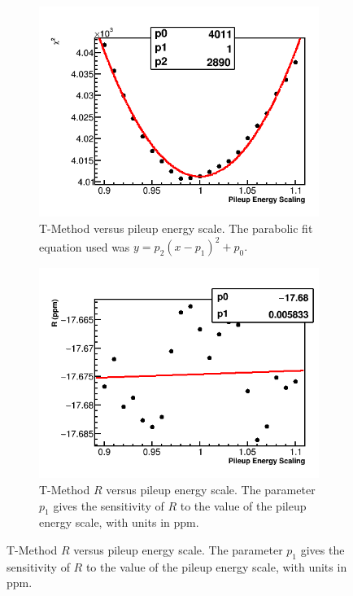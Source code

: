 \begin{figure}[h]
\centering
    \begin{subfigure}[t]{0.45\textwidth}
        \centering
        \includegraphics[width=\textwidth]{TMethod_Chi2_Vs_PileupEnergyScaling_Canv}
        \caption{T-Method \chisq versus pileup energy scale. The parabolic fit equation used was $y = p_{2}(x - p_{1})^{2} + p_{0}.$}
    \end{subfigure}%
    \hspace{1cm}
    \begin{subfigure}[t]{0.45\textwidth}
        \centering
        \includegraphics[width=\textwidth]{TMethod_R_Vs_PileupEnergyScaling_Canv}
        \caption{T-Method $R$ versus pileup energy scale. The parameter $p_{1}$ gives the sensitivity of $R$ to the value of the pileup energy scale, with units in ppm.}
    \end{subfigure}


\end{figure}
